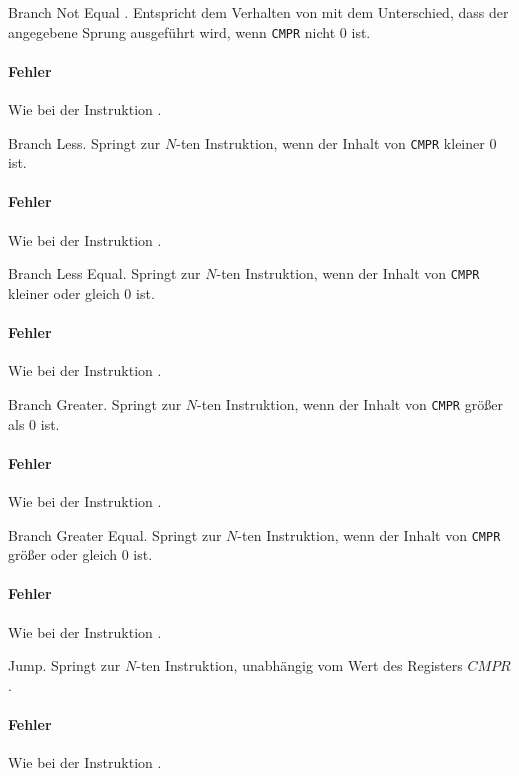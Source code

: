 \glqq Branch Not Equal \grqq.
Entspricht dem Verhalten von  mit dem Unterschied, dass der angegebene
Sprung ausgeführt wird, wenn \texttt{CMPR} nicht $0$ ist.

\paragraph{Fehler}
Wie bei der Instruktion .



\glqq Branch Less\grqq. 
Springt zur $N$-ten Instruktion, wenn der Inhalt von \texttt{CMPR} kleiner $0$
ist.

\paragraph{Fehler}
Wie bei der Instruktion .



\glqq Branch Less Equal\grqq.
Springt zur $N$-ten Instruktion, wenn der Inhalt von \texttt{CMPR} kleiner
oder gleich $0$ ist.

\paragraph{Fehler}
Wie bei der Instruktion .


\glqq Branch Greater\grqq.
Springt zur $N$-ten Instruktion, wenn der Inhalt von \texttt{CMPR} größer als
$0$ ist.

\paragraph{Fehler}
Wie bei der Instruktion .



\glqq Branch Greater Equal\grqq. 
Springt zur $N$-ten Instruktion, wenn der Inhalt von \texttt{CMPR} größer oder
gleich $0$ ist.

\paragraph{Fehler}
Wie bei der Instruktion .



\glqq Jump\grqq.
Springt zur $N$-ten Instruktion, unabhängig vom Wert des Registers $CMPR$.

\paragraph{Fehler}
Wie bei der Instruktion .


